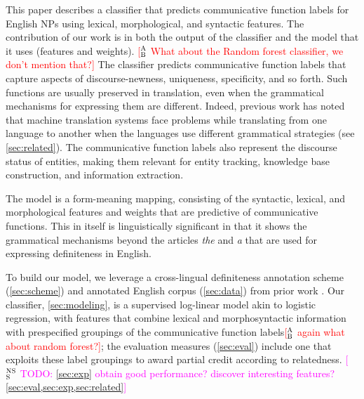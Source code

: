 \documentclass[11pt,letterpaper]{article}
\newcommand{\ensuretext}[1]{#1}
\newcommand{\nssmarker}{\ensuretext{\textcolor{magenta}{\ensuremath{^{\textsc{NS}}_{\textsc{S}}}}}}
\newcommand{\abmarker}{\ensuretext{\textcolor{red}{\ensuremath{^{\textsc{A}}_{\textsc{B}}}}}}
\newcommand{\arkcomment}[3]{\ensuretext{\textcolor{#3}{[#1 #2]}}}
\newcommand{\nss}[1]{\arkcomment{\nssmarker}{#1}{magenta}}
\newcommand{\ab}[1]{\arkcomment{\abmarker}{#1}{red}}
\begin{document}
This paper describes a classifier that predicts communicative function labels for English NPs  
using lexical, morphological, and syntactic features.   
The contribution of our work is in both the output of the classifier and the model that it uses (features and weights).  \ab{What about the Random forest classifier, we don’t mention that?}
The classifier predicts communicative function labels that capture aspects of discourse-newness, uniqueness, specificity, and so forth. %
Such functions are usually preserved in translation, even when the grammatical mechanisms 
for expressing them are different. 
Indeed, previous work has noted that machine translation systems face problems 
while translating from one language to another when the languages use different grammatical strategies (see \cref{sec:related}).
The communicative function labels also represent the discourse status of entities, 
making them relevant for entity tracking, knowledge base construction, and information extraction. 

The model is a form-meaning mapping, consisting of the syntactic, lexical, and morphological features 
and weights that are predictive of communicative functions.   
This in itself is linguistically significant in that it shows the grammatical mechanisms 
beyond the articles {\em the} and {\em a} that are used for expressing definiteness in English.   

To build our model, we leverage a cross-lingual definiteness annotation scheme (\cref{sec:scheme}) 
and annotated English corpus (\cref{sec:data}) from prior work \citep{bhatia14}.
Our classifier, \cref{sec:modeling}, is a supervised log-linear model akin to logistic regression,
with features that combine lexical and morphosyntactic information 
with prespecified groupings of the communicative function labels\ab{again what about random forest?};
the evaluation measures (\cref{sec:eval}) include one that exploits these label groupings 
to award partial credit according to relatedness.
\nss{TODO: \cref{sec:exp} obtain good performance? discover interesting features? \cref{sec:eval,sec:exp,sec:related}}
\end{document}

